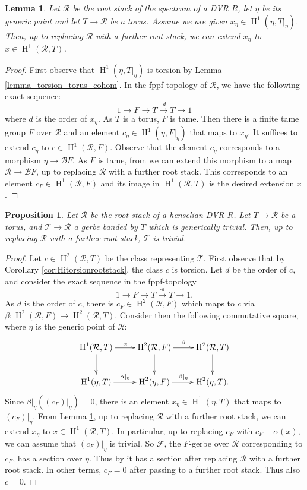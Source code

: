 \documentclass{amsart}
\newtheorem{lemma}[lemma]{Lemma}
\newtheorem{proposition}[proposition]{Proposition}
\theoremstyle{definition}
\newcommand{\cF}{\mathcal{F}}
\newcommand{\cB}{\mathcal{B}}
\newcommand{\oH}{\operatorname{H}}
\newcommand{\cR}{\mathcal{R}}
\newcommand{\cT}{\mathcal{T}}
\begin{document}
\begin{lemma}\label{lemma_case_BT}
    Let $\cR$ be the root stack of the spectrum of a DVR $R$, let $\eta$ be its generic point and let $T\to \cR$ be a torus. Assume we are given $x_\eta\in \oH^1(\eta,T|_\eta)$. Then, up to replacing $\cR$ with a further root stack, we can extend $x_\eta$ to $x\in \oH^1(\cR,T)$. 
\end{lemma}
\begin{proof}
First observe that $\oH^1(\eta,T|_\eta)$ is torsion by Lemma \ref{lemma_torsion_torus_cohom}.  In the fppf topology of $\cR$, we have the following exact sequence:
\[ 1\to F\to T\xrightarrow{\cdot d}T\to 1 
\] where $d$ is the order of $x_\eta$. As $T$ is a torus, $F$ is tame. Then there is a finite tame group $F$ over $\cR$ and an element $c_\eta\in \oH^1(\eta,F|_\eta)$ that maps to $x_\eta$. It suffices to extend $c_\eta$ to $c\in \oH^1(\cR,F)$. Observe that the element $c_\eta$ corresponds to a morphism $\eta \to \cB F$. As $F$ is tame, from \cite{bresciani2024arithmetic} we can extend this morphism to a map $\cR\to \cB F$, up to replacing $\cR$ with a further root stack. This corresponds to an element $c_F\in \oH^1(\cR,F)$ and its image in $\oH^1(\cR,T)$ is the desired extension $x$.
\end{proof}
\begin{proposition}\label{prop_gerbe_banded_by_t_trivial_generically_is_trivial_up_to_further_root}Let $\cR$ be the root stack of a henselian DVR $R$.
    Let $T\to \cR$ be a torus, and $\cT\to \cR$ a gerbe banded by $T$ which is generically trivial. Then, up to replacing $\cR$ with a further root stack, $\cT$ is trivial.
\end{proposition}
\begin{proof}
    Let $c\in \oH^2(\cR,T)$ be the class representing $\cT$. First observe that by Corollary \ref{cor:Hitorsionrootstack}, the class $c$ is torsion.
Let $d$ be the order of $c$, and consider the exact sequence in the fppf-topology
    \[
    1\to F\to T\xrightarrow{\cdot d}T\to 1.
    \]
    As $d$ is the order of $c$, there is $c_F\in \oH^2(\cR,F)$ which maps to $c$ via $\beta:\oH^2(\cR,F)\to \oH^2(\cR,T)$. 
    Consider then the following commutative square, where $\eta$ is the generic point of $\cR$:
    \[
\xymatrix{\oH^1(\cR,T)\ar[r]^\alpha\ar[d] & \oH^2(\cR,F)\ar[r]^\beta\ar[d] & \oH^2(\cR,T)\ar[d]\\\oH^1(\eta,T)\ar[r]^{\alpha|_\eta} & \oH^2(\eta,F)\ar[r]^{\beta|_\eta} & \oH^2(\eta,T).}
    \]
    Since $\beta|_\eta( (c_F)|_\eta)=0$, there is an element $x_\eta\in \oH^1(\eta,T)$ that maps to $(c_F)|_\eta$. From Lemma \ref{lemma_case_BT}, up to replacing $\cR$ with a further root stack,
    we can extend $x_\eta$ to $x\in \oH^1(\cR,T)$. In particular, up to replacing $c_F$ with $c_F - \alpha(x)$, we can assume that $(c_F)|_\eta$ is trivial. So $\cF$, the $F$-gerbe over $\cR$ corresponding to $c_F$, has a section over $\eta$. Thus by \cite{bresciani2024arithmetic} it has a section after replacing $\cR$ with a further root stack. In other terms, $c_F=0$ after passing to a further root stack. Thus also $c=0$.
\end{proof}
\end{document}
